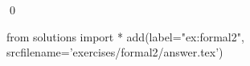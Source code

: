 
\begin{ex} 
  \label{ex:formal2}
  
  \qed
\end{ex} 
\begin{python0}
from solutions import *
add(label="ex:formal2",
    srcfilename='exercises/formal2/answer.tex') 
\end{python0}
